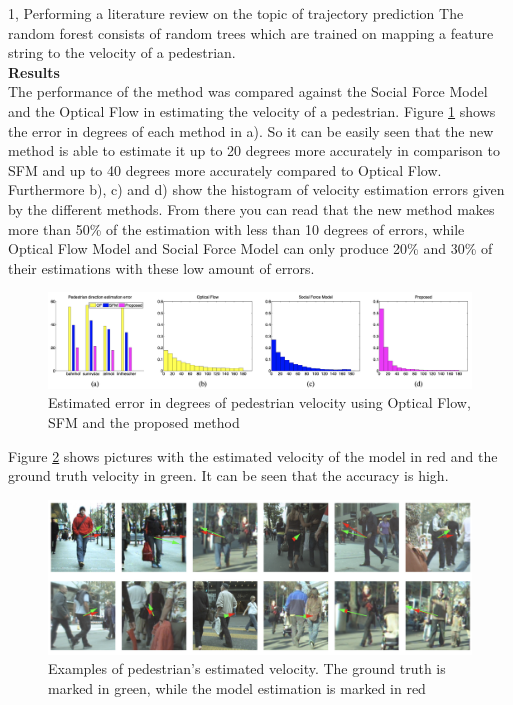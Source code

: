\documentclass[10pt,a4paper]{article}
\begin{document}
\begin{task}{1, Performing a literature review on the topic of trajectory prediction}
    The random forest consists of random trees which are trained on mapping a feature string to the velocity of a pedestrian.\\
    \textbf{Results}\\
    The performance of the method was compared against the Social Force Model and the Optical Flow in estimating the velocity of a pedestrian. Figure \ref{fig:degree_error} shows the error in degrees of each method in a). So it can be easily seen that the new method is able to estimate it up to 20 degrees more accurately in comparison to SFM and up to 40 degrees more accurately compared to Optical Flow. Furthermore b), c) and d) show the histogram of velocity estimation errors given by the different methods. From there you can read that the new method makes more than 50\% of the estimation with less than 10 degrees of errors, while Optical Flow Model and Social Force Model can only produce 20\% and 30\% of their estimations with these low amount of errors.
    \begin{figure}[H]
        \centering
        \includegraphics[width=\textwidth]{pictures/errors.png}
        \caption{Estimated error in degrees of pedestrian velocity using Optical Flow, SFM and the proposed method \cite{laura}}
    \label{fig:degree_error}
    \end{figure}
    Figure \ref{fig:examples} shows pictures with the estimated velocity of the model in red and the ground truth velocity in green. It can be seen that the accuracy is high.
    \begin{figure}[H]
        \centering
        \includegraphics[width=\textwidth]{pictures/examples.png}
        \caption{Examples of pedestrian's estimated velocity. The ground truth is marked in green, while the model estimation is marked in red \cite{laura}}
        \label{fig:examples}
    \end{figure}


\end{task}
\end{document}
